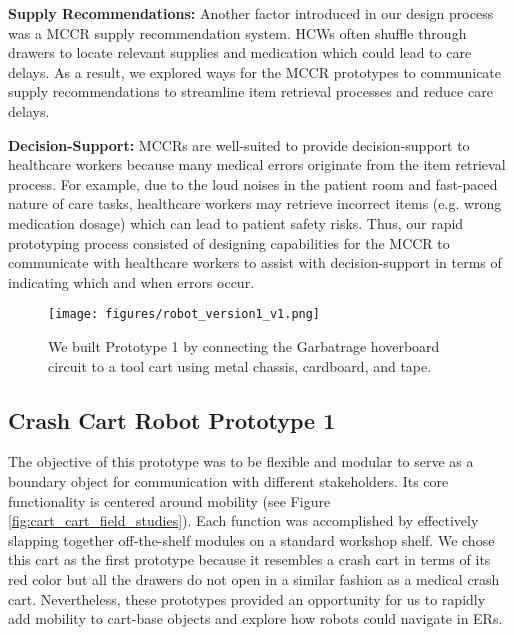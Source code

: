 \textbf{Supply Recommendations:} Another factor introduced in our design process was a MCCR supply recommendation system. 
HCWs often shuffle through drawers to locate relevant supplies and medication which could lead to care delays. 
As a result, we explored ways for the MCCR prototypes to communicate supply recommendations to streamline item retrieval processes and reduce care delays.

\textbf{Decision-Support:} MCCRs are well-suited to provide decision-support to healthcare workers because many medical errors originate from the item retrieval process. 
For example, due to the loud noises in the patient room and fast-paced nature of care tasks, healthcare workers may retrieve incorrect items (e.g. wrong medication dosage) which can lead to patient safety risks. 
Thus, our rapid prototyping process consisted of designing capabilities for the MCCR to communicate with healthcare workers to assist with decision-support in terms of indicating which and when errors occur. 


 \begin{figure}[t] 
	\centering 
	\texttt{[image: figures/robot\_version1\_v1.png]} 
	\caption{We built Prototype 1 by connecting the Garbatrage hoverboard circuit \cite{mandel2023recapturing} to a tool cart using metal chassis, cardboard, and tape.} 
	\label{fig:robot_version1} 
\end{figure}

\subsection{Crash Cart Robot Prototype 1}

The objective of this prototype was to be flexible and modular to serve as a boundary object for communication with different stakeholders. 
Its core functionality is centered around mobility \textcolor{black}{(}see Figure \ref{fig:cart_cart_field_studies}). Each function was accomplished by effectively slapping together off-the-shelf modules on a standard workshop shelf.
We chose this cart as the first prototype because it resembles a crash cart in terms of its red color but all the drawers do not open in a similar fashion as a medical crash cart.
Nevertheless, these prototypes provided an opportunity for us to rapidly add mobility to cart-base objects and explore how robots could navigate in ERs.

